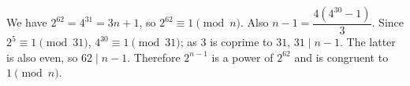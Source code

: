 We have $2^{62}=4^{31}=3n+1$, so $2^{62}\equiv1\pmod n$. Also $n-1=\dfrac{4(4^{30}-1)}{3}$. Since $2^5\equiv1\pmod{31}$, $4^{30}\equiv1\pmod{31}$; as $3$ is coprime to $31$, $31\mid n-1$. The latter is also even, so $62\mid n-1$. Therefore $2^{n-1}$ is a power of $2^{62}$ and is congruent to $\boxed1\pmod n$.
